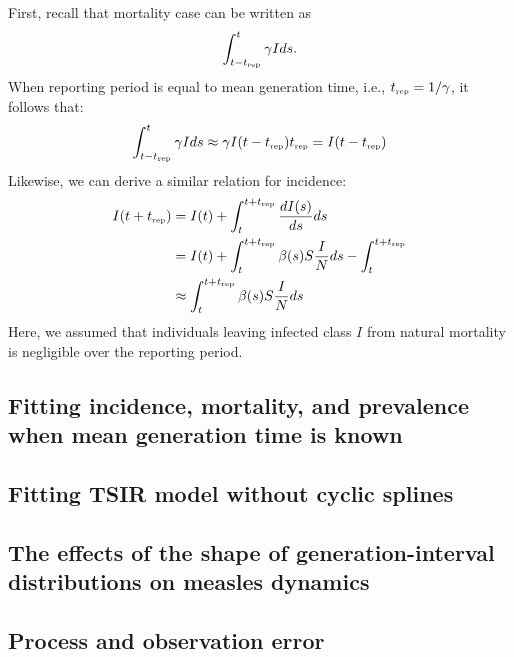 \documentclass{article}
\newcommand{\tsub}[2]{#1_{{\textrm{\tiny #2}}}}
\begin{document}
First, recall that mortality case can be written as
\begin{equation}
\int_{t-\tsub{t}{rep}}^{t} \gamma I ds.
\end{equation}
When reporting period is equal to mean generation time, i.e., $\tsub{t}{rep} = 1/\gamma$, 
it follows that:
\begin{equation}
\int_{t-\tsub{t}{rep}}^{t} \gamma I ds \approx \gamma I(t-\tsub{t}{rep}) \tsub{t}{rep} = I(t-\tsub{t}{rep})
\end{equation}
Likewise, we can derive a similar relation for incidence:
\begin{equation}
\begin{aligned}
I(t+\tsub{t}{rep}) &= I(t) + \int_{t}^{t+\tsub{t}{rep}} \frac{dI(s)}{ds} ds\\
&= I(t) + \int_{t}^{t+\tsub{t}{rep}} \beta(s) S \frac{I}{N} ds - \int_{t}^{t+\tsub{t}{rep}}\\
&\approx \int_{t}^{t+\tsub{t}{rep}} \beta(s) S \frac{I}{N} ds
\end{aligned}
\end{equation}
Here, we assumed that individuals leaving infected class $I$ from natural mortality is negligible over the reporting period.

\pagebreak
\subsection{Fitting incidence, mortality, and prevalence when mean generation time is known}

\pagebreak
\subsection{Fitting TSIR model without cyclic splines}

\pagebreak
\subsection{The effects of the shape of generation-interval distributions on measles dynamics}

\pagebreak
\subsection{Process and observation error}
\end{document}
